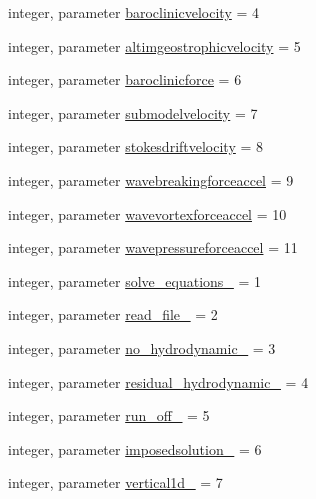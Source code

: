 \begin{DoxyCompactItemize}
\item 
integer, parameter \mbox{\hyperlink{namespacemodulehydrodynamic_a6dff582748a31326ff3452989be5d686}{baroclinicvelocity}} = 4
\item 
integer, parameter \mbox{\hyperlink{namespacemodulehydrodynamic_aaf56db5dff4032bdc271e9661a1e7286}{altimgeostrophicvelocity}} = 5
\item 
integer, parameter \mbox{\hyperlink{namespacemodulehydrodynamic_afca6e46bfa2d959d2be36aa37504de07}{baroclinicforce}} = 6
\item 
integer, parameter \mbox{\hyperlink{namespacemodulehydrodynamic_ae4ed7c2aa878fe8600f68206a805e046}{submodelvelocity}} = 7
\item 
integer, parameter \mbox{\hyperlink{namespacemodulehydrodynamic_ae80a767c90ef42046d7d809b02831b3f}{stokesdriftvelocity}} = 8
\item 
integer, parameter \mbox{\hyperlink{namespacemodulehydrodynamic_a85d4e406fa8803b563f2e18473cffd63}{wavebreakingforceaccel}} = 9
\item 
integer, parameter \mbox{\hyperlink{namespacemodulehydrodynamic_a828e8991e1580c3cfdd50607a446fbd8}{wavevortexforceaccel}} = 10
\item 
integer, parameter \mbox{\hyperlink{namespacemodulehydrodynamic_a3847705bc2f5eff4713dd7d73b599b05}{wavepressureforceaccel}} = 11
\item 
integer, parameter \mbox{\hyperlink{namespacemodulehydrodynamic_a47408b2c066e95c9620e69f86d5938a6}{solve\+\_\+equations\+\_\+}} = 1
\item 
integer, parameter \mbox{\hyperlink{namespacemodulehydrodynamic_a25731915f5b023304f88829f36638ad6}{read\+\_\+file\+\_\+}} = 2
\item 
integer, parameter \mbox{\hyperlink{namespacemodulehydrodynamic_a3e95504ebcd5b1792533b2e3618b9771}{no\+\_\+hydrodynamic\+\_\+}} = 3
\item 
integer, parameter \mbox{\hyperlink{namespacemodulehydrodynamic_a01c55cb119451119e83b9ae24741b1b5}{residual\+\_\+hydrodynamic\+\_\+}} = 4
\item 
integer, parameter \mbox{\hyperlink{namespacemodulehydrodynamic_a2d9fe7271d7e4f545caa134ac3a37400}{run\+\_\+off\+\_\+}} = 5
\item 
integer, parameter \mbox{\hyperlink{namespacemodulehydrodynamic_a46f6dd5f0775b41bcb749a0798290b7b}{imposedsolution\+\_\+}} = 6
\item 
integer, parameter \mbox{\hyperlink{namespacemodulehydrodynamic_ac66894bee5bb658a00ab389caf0b81f4}{vertical1d\+\_\+}} = 7

\end{DoxyCompactItemize}
